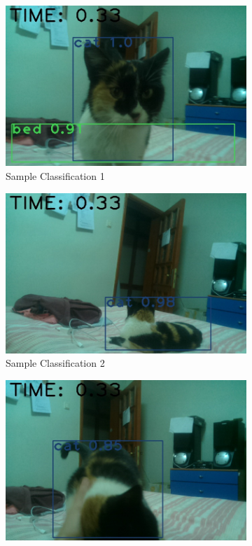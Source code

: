 \begin{figure}[h]
    \centering
    \begin{subfigure}[t]{0.49\linewidth}
    \includegraphics[width=\linewidth]{eserImg/sampleClassification1.jpg}
    \caption{Sample Classification 1}
    \label{fig:classificationSample1}
    \end{subfigure}
    \begin{subfigure}[t]{0.49\linewidth}
    \includegraphics[width=\linewidth]{eserImg/sampleClassification2.jpg}
    \caption{Sample Classification 2}
    \label{fig:classificationSample1}
    \end{subfigure}
    \begin{subfigure}[t]{0.49\linewidth}
    \includegraphics[width=\linewidth]{eserImg/sampleClassification3.jpg}

\end{subfigure}
\end{figure}
